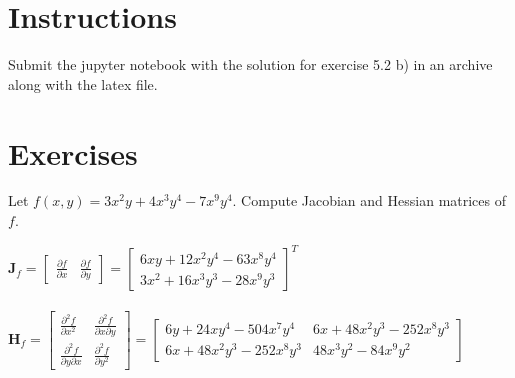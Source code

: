 \def\pathToRoot{.}


\def\issolution{}




\section*{Instructions}
Submit the jupyter notebook with the solution for exercise 5.2 b) in an archive along with the latex file.


\section*{Exercises}

\begin{exercise}

Let $f(x,y) = 3x^2 y + 4x^3 y^4 - 7x^9 y^4$. Compute Jacobian and Hessian matrices of $f$.
\end{exercise}


\begin{solution}

$\textbf{J}_f = 
    \begin{bmatrix}
     \frac{\partial f}{\partial x} & \frac{\partial f}{\partial y}
    \end{bmatrix} =
    \begin{bmatrix}
    6xy + 12x^2y^4 - 63x^8y^4 \\
    3x^2 + 16x^3y^3 - 28x^9y^3
    \end{bmatrix}^T $
\\
\\
   $\textbf{H}_f = 
   \begin{bmatrix}
    \frac{\partial^2 f}{\partial x^2} & \frac{\partial^2 f}{\partial x \partial y}\\
    \frac{\partial^2 f}{\partial y \partial x} & \frac{\partial^2 f}{\partial y^2}
    \end{bmatrix} = 
   \begin{bmatrix}
    6y + 24xy^4 - 504x^7y^4 & 6x + 48x^2y^3 - 252x^8y^3\\
    6x + 48x^2y^3 - 252x^8y^3 & 48x^3y^2 - 84x^9y^2
    \end{bmatrix} $
    \end{solution}


